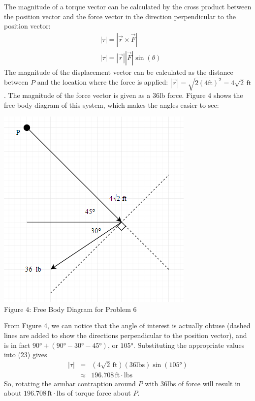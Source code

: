 \documentclass[12]{article}
\begin{document}
The magnitude of a torque vector can be calculated by the cross product between the position vector and the force vector in the direction perpendicular to the position vector:
\begin{eqnarray}
&|\tau| = |\vec{r} \times \vec{F}|\\
&|\tau| = |\vec{r}||\vec{F}|\sin{(\theta)}
\end{eqnarray}
The magnitude of the displacement vector can be calculated as the distance between $P$ and the location where the force is applied: $|\vec{r}| = \sqrt{2({4\mathrm{ft}})^2} = 4\sqrt{2}\,\mathrm{ft}$. The magnitude of the force vector is given as a 36lb force. Figure 4 shows the free body diagram of this system, which makes the angles easier to see:
\begin{center}
\includegraphics[scale=.75]{6_FBD_2.png}\\
Figure 4: Free Body Diagram for Problem 6
\end{center}
From Figure 4, we can notice that the angle of interest is actually obtuse (dashed lines are added to show the directions perpendicular to the position vector), and is in fact $\ang{90} + (\ang{90}-\ang{30}-\ang{45})$, or $\ang{105}$. Substituting the appropriate values into (23) gives
\begin{eqnarray}
|\tau| &=& (4\sqrt{2}\,\mathrm{ft})(36\mathrm{lbs})\sin{(\ang{105})}\\
&\approx & 196.708\,\mathrm{ft\cdot lbs}
\end{eqnarray}
So, rotating the armbar contraption around $P$ with 36lbs of force will result in about $196.708\,\mathrm{ft\cdot lbs}$ of torque force about $P$.\\
\end{document}
